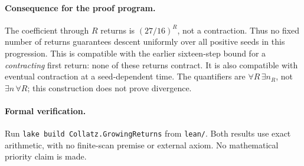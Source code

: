 \documentclass[10pt]{article}
\begin{document}
\paragraph{Consequence for the proof program.}
The coefficient through $R$ returns is $(27/16)^R$, not a contraction.
Thus no fixed number of returns guarantees descent uniformly over all
positive seeds in this progression. This is compatible with the earlier
sixteen-step bound for a \emph{contracting} first return: none of these
returns contract. It is also compatible with eventual contraction at a
seed-dependent time. The quantifiers are $\forall R\,\exists n_R$, not
$\exists n\,\forall R$; this construction does not prove divergence.

\raggedright
\paragraph{Formal verification.}
Run \texttt{lake build Collatz.GrowingReturns} from \texttt{lean/}.
Both results use exact arithmetic, with no finite-scan premise or external
axiom. No mathematical priority claim is made.
\end{document}
